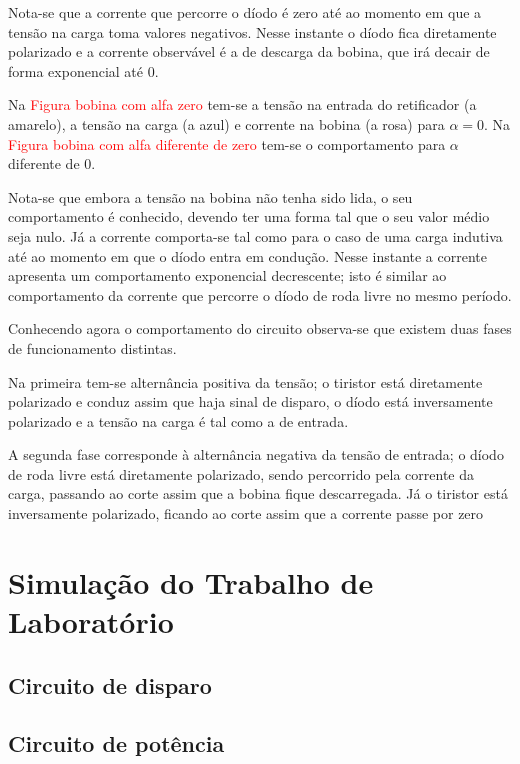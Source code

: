 \documentclass[a4paper,11pt]{article}
\numberwithin{equation}{section}
\begin{document}
Nota-se que a corrente que percorre o díodo é zero até ao momento em que a tensão na carga toma valores negativos. Nesse instante o díodo fica diretamente polarizado e a corrente observável é a de descarga da bobina, que irá decair de forma exponencial até $0$.


Na \textcolor{red}{Figura bobina com alfa zero} tem-se a tensão na entrada do retificador (a amarelo), a tensão na carga (a azul) e corrente na bobina (a rosa) para $\alpha = 0$. Na \textcolor{red}{Figura bobina com alfa diferente de zero} tem-se o comportamento para $\alpha$ diferente de $0$.

Nota-se que embora a tensão na bobina não tenha sido lida, o seu comportamento é conhecido, devendo ter uma forma tal que o seu valor médio seja nulo. Já a corrente comporta-se tal como para o caso de uma carga indutiva até ao momento em que o díodo entra em condução. Nesse instante a corrente apresenta um comportamento exponencial decrescente; isto é similar ao comportamento da corrente que percorre o díodo de roda livre no mesmo período.

Conhecendo agora o comportamento do circuito observa-se que existem duas fases de funcionamento distintas.

Na primeira tem-se alternância positiva da tensão; o tiristor está diretamente polarizado e conduz assim que haja sinal de disparo, o díodo está inversamente polarizado e a tensão na carga é tal como a de entrada.

A segunda fase corresponde à alternância negativa da tensão de entrada; o díodo de roda livre está diretamente polarizado, sendo percorrido pela corrente da carga, passando ao corte assim que a bobina fique descarregada. Já o tiristor está inversamente polarizado, ficando ao corte assim que a corrente passe por zero

\section{Simulação do Trabalho de Laboratório}


\subsection{Circuito de disparo}

\subsection{Circuito de potência}
\end{document}
